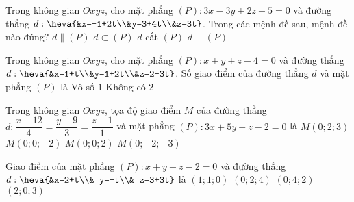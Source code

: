 \begin{ex}%
Trong không gian $Oxyz$, cho mặt phẳng $(P): 3x-3y+2z-5=0$ và đường thẳng $d:\heva{&x=-1+2t\\&y=3+4t\\&z=3t}$. Trong các mệnh đề sau, mệnh đề nào đúng?
\choice
{\True $d\parallel (P)$}
{$d\subset (P)$}
{$d$ cắt $(P)$}
{$d\perp (P)$}
\end{ex}

\begin{ex}%
Trong không gian $Oxyz$, cho mặt phẳng $(P):x+y+z-4=0$ và đường thẳng $d:\heva{&x=1+t\\&y=1+2t\\&z=2-3t}$. Số giao điểm của đường thẳng $d$ và mặt phẳng $(P)$ là
\choice
{\True Vô số}
{$1$}
{Không có}
{$2$}
\end{ex}

\begin{ex}%
Trong không gian $Oxyz$, tọa độ giao điểm $M$ của đường thẳng $d:\dfrac{x-12}{4}=\dfrac{y-9}{3}=\dfrac{z-1}{1}$ và mặt phẳng $(P):3x+5y-z-2=0$ là
\choice
{$M(0;2;3)$}
{\True $M(0;0;-2)$}
{$M(0;0;2)$}
{$M(0;-2;-3)$}
\end{ex}

\begin{ex}%
Giao điểm của mặt phẳng $(P):x+y-z-2=0$ và đường thẳng $d:\heva{&x=2+t\\& y=-t\\& z=3+3t}$ là
\choice
{\True $(1;1;0)$}
{$(0;2;4)$}
{$(0;4;2)$}
{$(2;0;3)$}
\end{ex}

